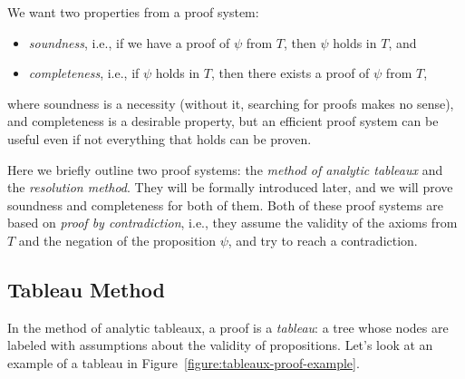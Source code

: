 We want two properties from a proof system:
\begin{itemize}
    \item \emph{soundness}, i.e., if we have a proof of \( \psi \) from \( T \), then \( \psi \) holds in \( T \), and
    \item \emph{completeness}, i.e., if \( \psi \) holds in \( T \), then there exists a proof of \( \psi \) from \( T \),
\end{itemize}
where soundness is a necessity (without it, searching for proofs makes no sense), and completeness is a desirable property, but an efficient proof system can be useful even if not everything that holds can be proven.

Here we briefly outline two proof systems: the \emph{method of analytic tableaux} and the \emph{resolution method}. They will be formally introduced later, and we will prove soundness and completeness for both of them. Both of these proof systems are based on \emph{proof by contradiction}, i.e., they assume the validity of the axioms from \( T \) and the negation of the proposition \( \psi \), and try to reach a contradiction.




\subsection{Tableau Method}

In the method of analytic tableaux, a proof is a \emph{tableau}: a tree whose nodes are labeled with assumptions about the validity of propositions. Let's look at an example of a tableau in Figure~\ref{figure:tableaux-proof-example}.

